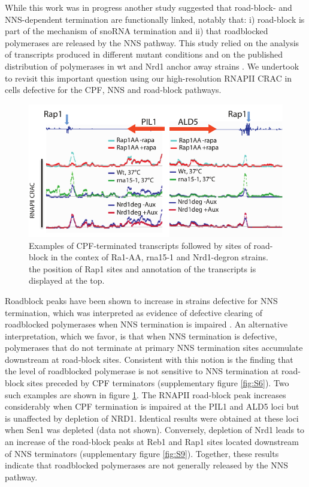 While this work was in progress another study suggested that road-block- and NNS-dependent termination are functionally linked, notably that: i) road-block is part of the mechanism of snoRNA termination and ii) that roadblocked polymerases are released by the NNS pathway. This study relied on the analysis of transcripts produced in different mutant conditions and on the published distribution of polymerases in wt and Nrd1 anchor away strains \cite{roy:2016:common}. We undertook to revisit this important question using our high-resolution RNAPII CRAC in cells defective for the CPF, NNS and road-block pathways. 

\begin{figure}[hp!]

\centering
\includegraphics[width=\textwidth]{figures/results/rap/six.pdf}
\caption[Examples of CPF-terminated transcripts followed by sites of Rap1]{Examples of CPF-terminated transcripts followed by sites of road-block in the contex of Ra1-AA, rna15-1 and Nrd1-degron strains. the position of Rap1 sites and annotation of the transcripts is displayed at the top.}
\label{fig:six}

\end{figure}

Roadblock peaks have been shown to increase in strains defective for NNS termination, which was interpreted as evidence of defective clearing of roadblocked polymerases when NNS termination is impaired \cite{roy:2016:common}. An alternative interpretation, which we favor, is that when NNS termination is defective, polymerases that do not terminate at primary NNS termination sites accumulate downstream at road-block sites.  Consistent with this notion is the finding that the level of roadblocked polymerase is not sensitive to NNS termination at road-block sites preceded by CPF terminators (supplementary figure \ref{fig:S6}). Two such examples are shown in figure \ref{fig:six}. The RNAPII road-block peak increases considerably when CPF termination is impaired at the PIL1 and ALD5 loci but is unaffected by depletion of NRD1. Identical results were obtained at these loci when Sen1 was depleted (data not shown). Conversely, depletion of Nrd1 leads to an increase of the road-block peaks at Reb1 and Rap1 sites located downstream of NNS terminators (supplementary figure \ref{fig:S9}). Together, these results indicate that roadblocked polymerases are not generally released by the NNS pathway. 

